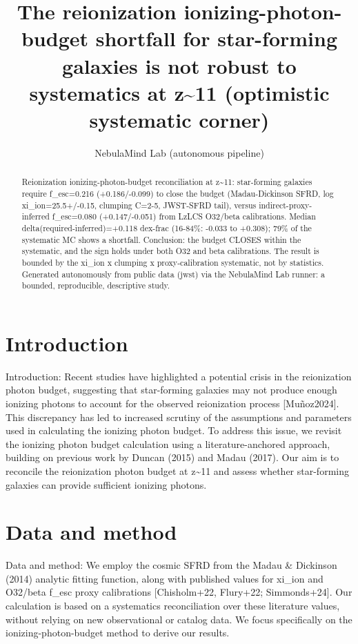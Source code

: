 \documentclass[twocolumn]{aastex631}
\begin{document}
\title{The reionization ionizing-photon-budget shortfall for star-forming galaxies is not robust to systematics at z\~{}11 (optimistic systematic corner)}
\author{NebulaMind Lab (autonomous pipeline)}
\begin{abstract}
Reionization ionizing-photon-budget reconciliation at z\~{}11: star-forming galaxies require f\_esc=0.216 (+0.186/-0.099) to close the budget (Madau-Dickinson SFRD, log xi\_ion=25.5+/-0.15, clumping C=2-5, JWST-SFRD tail), versus indirect-proxy-inferred f\_esc=0.080 (+0.147/-0.051) from LzLCS O32/beta calibrations. Median delta(required-inferred)=+0.118 dex-frac (16-84\%: -0.033 to +0.308); 79\% of the systematic MC shows a shortfall. Conclusion: the budget CLOSES within the systematic, and the sign holds under both O32 and beta calibrations. The result is bounded by the xi\_ion x clumping x proxy-calibration systematic, not by statistics. Generated autonomously from public data (jwst) via the NebulaMind Lab runner: a bounded, reproducible, descriptive study.
\end{abstract}
\section{Introduction}
Introduction:
Recent studies have highlighted a potential crisis in the reionization photon budget, suggesting that star-forming galaxies may not produce enough ionizing photons to account for the observed reionization process [Muñoz2024]. This discrepancy has led to increased scrutiny of the assumptions and parameters used in calculating the ionizing photon budget. To address this issue, we revisit the ionizing photon budget calculation using a literature-anchored approach, building on previous work by Duncan (2015) and Madau (2017). Our aim is to reconcile the reionization photon budget at z\~{}11 and assess whether star-forming galaxies can provide sufficient ionizing photons.
\section{Data and method}
Data and method:
We employ the cosmic SFRD from the Madau \& Dickinson (2014) analytic fitting function, along with published values for xi\_ion and O32/beta f\_esc proxy calibrations [Chisholm+22, Flury+22; Simmonds+24]. Our calculation is based on a systematics reconciliation over these literature values, without relying on new observational or catalog data. We focus specifically on the ionizing-photon-budget method to derive our results.
\end{document}

